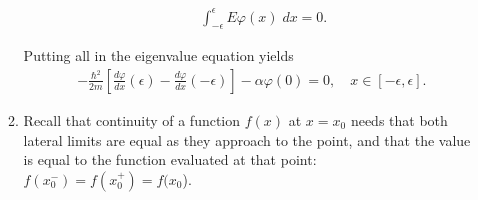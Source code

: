 \documentclass[letterpaper,11pt,twoside]{article}
\begin{document}
\begin{enumerate}[itemsep=0pt,topsep=0pt,label=(\alph*)]
\begin{enumerate}[itemsep=0pt,topsep=0pt,label=(a.\arabic*)]
\begin{itemize}
      \begin{align*}
        \int_{-\epsilon}^\epsilon E\varphi(x)\;dx=0.
      \end{align*}
    \end{itemize}
    Putting all in the eigenvalue equation yields
    \begin{align}
      -\frac{\hbar^2}{2m}\left[\frac{d\varphi}{dx}(\epsilon)
        -\frac{d\varphi}{dx}(-\epsilon)\right]-\alpha\varphi(0)=0,\quad x\in[-\epsilon,\epsilon].
        \label{eq:inteigenvalueequation}
    \end{align}
    \item Recall that continuity of a function $f(x)$ at $x=x_0$ needs that both lateral limits are equal as they approach to the point, 
    and that the value is equal to the function evaluated at that point: $f(x_0^-)=f(x_0^+)=f(x_0$).


\end{enumerate}
\end{enumerate}
\end{document}

